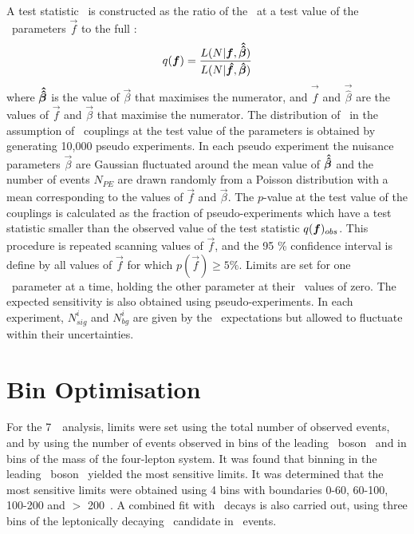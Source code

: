 A test statistic \teststat\ is constructed as the ratio of the \maxprofilellh\
at a test value of the \TGC\ parameters $\vec{f}$ to the full \maxprofilellh:
\begin{equation}
q(\boldsymbol{f}) =
\frac{L(N|\boldsymbol{f},\boldsymbol{\hat{\hat{\beta}}})}{L(N|\boldsymbol{\hat{f}},\boldsymbol{\hat{\beta}})}
\end{equation}
where $\boldsymbol{\hat{\hat{\beta}}}$ is the value of $\vec{\beta}$ that maximises the
numerator, and $\vec{\hat{f}}$ and $\vec{\hat{\beta}}$ are the values of
$\vec{f}$ and $\vec{\beta}$ that maximise the numerator. The distribution of
\teststat\ in the assumption of \TGC\ couplings at the test value of the
parameters is obtained by generating 10,000 pseudo experiments. In each
pseudo experiment the nuisance parameters $\vec{\beta}$ are Gaussian
fluctuated around the mean value of $\boldsymbol{\hat{\hat{\beta}}}$ and the number of events
$N_{PE}$ are drawn randomly from a Poisson distribution with a mean corresponding to the
values of $\vec{f}$ and $\vec{\beta}$. The $p$-value at the test value of the
couplings is calculated as the fraction of pseudo-experiments which have a test
statistic smaller than the observed value of the test statistic $q(\boldsymbol{f})_{obs}$.
This procedure is repeated scanning values of $\vec{f}$, and the 95 \%
confidence interval is define by all values of $\vec{f}$ for which
$p(\vec{f})\geq 5\%$. Limits are set for one \TGC\ parameter at a time, holding
the other parameter at their \sm\ values of zero. The expected sensitivity is
also obtained using pseudo-experiments. In each
experiment, $N^{i}_{sig}$ and $N^{i}_{bg}$ are given by the \sm\ expectations but
allowed to fluctuate within their uncertainties.

\section{Bin Optimisation}

For the 7~\tev\ analysis, limits were set using the total number of observed
events, and by using the number of events observed in bins of the leading \Z\
boson \pt\ and in bins of the mass of the four-lepton system. It was found that
binning in the leading \Z\ boson \pt\ yielded the most sensitive limits. It was
determined that the most sensitive limits were obtained using 4 bins with
boundaries 0-60, 60-100, 100-200 and $>$ 200~\GeV. A combined fit with \ZZllvv\
decays is also carried out, using three bins of the leptonically decaying \Z\
candidate in \ZZllvv\ events.

